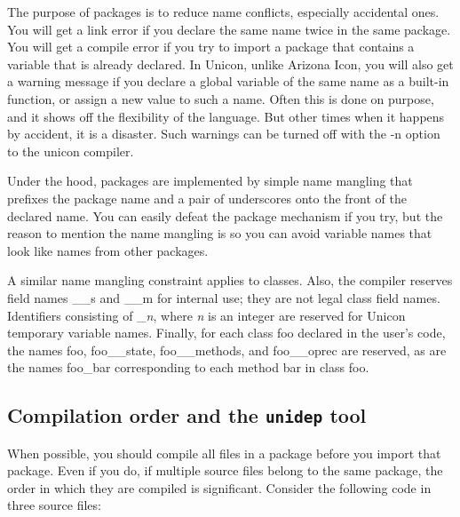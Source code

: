 The purpose of packages is to reduce name conflicts, especially accidental
ones. You will get a link error if you declare the same name twice in the same
package. You will get a compile error if you try to import a
package that contains a variable that is already declared. In Unicon, unlike
Arizona Icon, you will also get a warning message if you declare a global
variable of the same name as a built-in function, or assign a new value to such
a name. Often this is done on purpose, and it shows off the flexibility of the
language. But other times when it happens by accident, it is a disaster. Such
warnings can be turned off with the \textsf{{}-n} option to the \textsf{unicon}
compiler.

Under the hood, packages are implemented by simple name mangling that prefixes
the package name and a pair of underscores onto the front of the declared
name. You can easily defeat the package mechanism if you try, but the reason to
mention the name mangling is so you can avoid variable names that look like
names from other packages.

A similar name mangling constraint applies to
classes. Also, the compiler reserves field names \textsf{\_\_s} and
\textsf{\_\_m} for internal use; they are not legal class field names.
Identifiers consisting of \textsf{\_}\textsf{\textit{n}}, where \textit{n}
is an integer are reserved for Unicon temporary variable names. Finally,
for each class \textsf{foo} declared in the user's code, the names
\textsf{foo}, \textsf{foo\_\_state}, \textsf{foo\_\_methods}, and
\textsf{foo\_\_oprec} are reserved, as are the names \textsf{foo\_bar}
corresponding to each method \textsf{bar} in class \textsf{foo}.


\subsection*{Compilation order and the \texttt{unidep} tool}

When possible, you should compile all files in a package before you
import that package. Even if you do, if multiple source files belong to
the same package, the order in which they are compiled is significant.
Consider the following code in three source files:

